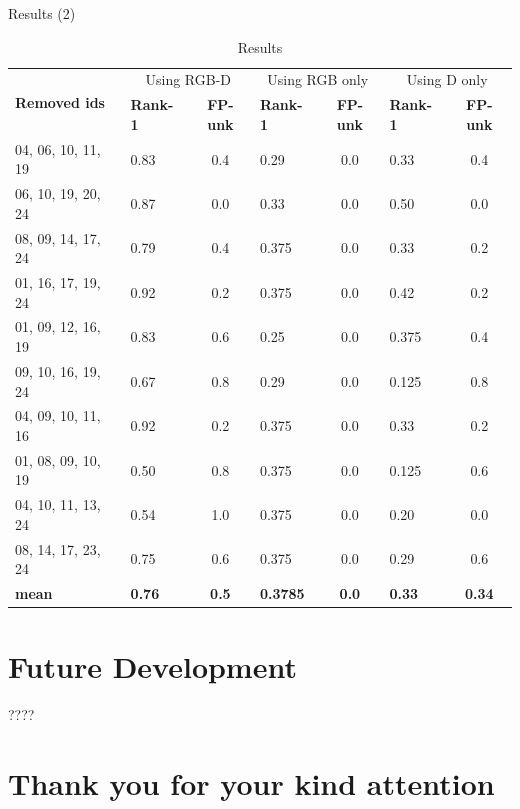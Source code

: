 \documentclass{beamer}
\begin{document}
\begin{frame}{Results (2)}
	\scriptsize
	\begin{table}[]
		\centering
		\caption{Results}
		\label{tab:results}
		\begin{tabular}{|l|l|c|l|c|l|c|}
			\hline
			\multirow{2}{*}{\bf Removed ids} & \multicolumn{2}{c|}{Using RGB-D} &\multicolumn{2}{c|}{Using RGB only} &\multicolumn{2}{c|}{Using D only} \\ \cline{2-7}
							 & \bf Rank-1 & \bf FP-unk          & \bf Rank-1 & \bf FP-unk            & \bf Rank-1 & \bf FP-unk  \\ \hline
			04, 06, 10, 11, 19               & 0.83	      & 0.4                 & 0.29       & 0.0                         & 0.33       & 0.4\\ \hline
			06, 10, 19, 20, 24               & 0.87	      & 0.0                 & 0.33       & 0.0                         & 0.50       & 0.0\\ \hline
			08, 09, 14, 17, 24               & 0.79	      & 0.4                 & 0.375      & 0.0                         & 0.33       & 0.2\\ \hline
			01, 16, 17, 19, 24               & 0.92	      & 0.2                 & 0.375      & 0.0                         & 0.42       & 0.2\\ \hline
			01, 09, 12, 16, 19               & 0.83	      & 0.6                 & 0.25       & 0.0                         & 0.375      & 0.4\\ \hline
			09, 10, 16, 19, 24               & 0.67	      & 0.8                 & 0.29       & 0.0                         & 0.125      & 0.8\\ \hline
			04, 09, 10, 11, 16               & 0.92	      & 0.2                 & 0.375      & 0.0                         & 0.33       & 0.2\\ \hline
			01, 08, 09, 10, 19               & 0.50	      & 0.8                 & 0.375      & 0.0                         & 0.125      & 0.6\\ \hline
			04, 10, 11, 13, 24               & 0.54	      & 1.0                 & 0.375      & 0.0                         & 0.20       & 0.0\\ \hline
			08, 14, 17, 23, 24               & 0.75	      & 0.6                 & 0.375      & 0.0                         & 0.29       & 0.6\\ \hline
			\bf mean                         & \bf 0.76   & \bf 0.5             & \bf 0.3785 & \bf 0.0                     & \bf 0.33   & \bf 0.34\\ \hline
		\end{tabular}
	\end{table}


\end{frame}

\section{Future Development}
\begin{frame}
	????
\end{frame}

\section*{Thank you for your kind attention}
\end{document}
